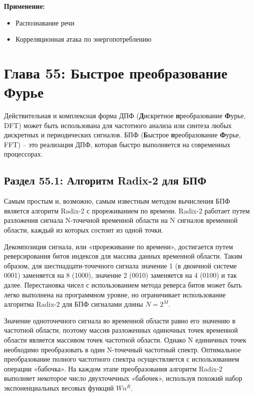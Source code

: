 \vspace{\baselineskip}
\textbf{Применение:}

\begin{itemize}
  \item	Распознавание речи
  \item	Корреляционная атака по энергопотреблению
\end{itemize}

\chapter*{Глава 55: Быстрое преобразование Фурье}

\vspace{-0.3cm}
Действительная и комплексная форма ДПФ (\textbf{Д}искретное \textbf{п}реобразование \textbf{Ф}урье, DFT) может быть использована для частотного анализа или синтеза любых дискретных и периодических сигналов. БПФ (\textbf{Б}ыстрое \textbf{п}реобразование \textbf{Ф}урье, FFT) – это реализация ДПФ, которая быстро выполняется на современных процессорах.

\section*{Раздел 55.1: Алгоритм Radix-2 для БПФ}

Самым простым и, возможно, самым известным методом вычисления БПФ является алгоритм Radix-2 с прореживанием по времени. Radix-2 работает путем разложения сигнала N-точечной временной области на N сигналов временной области, каждый из которых состоит из одной точки.


Декомпозиция сигнала, или «прореживание по времени», достигается путем реверсирования битов индексов для массива данных временной области. Таким образом, для шестнадцати-точечного сигнала значение 1 (в двоичной системе 0001) заменяется на 8 (1000), значение 2 (0010) заменяется на 4 (0100) и так далее. Перестановка чисел с использованием метода реверса битов может быть легко выполнена на программном уровне, но ограничивает использование алгоритма Radix-2 для БПФ сигналами длины $N=2^M$.

\vspace{\baselineskip}
Значение одноточечного сигнала во временной области равно его значению в частотной области, поэтому массив разложенных одиночных точек временной области является массивом точек частотной области. Однако N единичных точек необходимо преобразовать в один N-точечный частотный спектр. Оптимальное преобразование полного частотного спектра осуществляется с использованием операции «бабочка». На каждом этапе преобразования алгоритм Radix-2 выполняет некоторое число двухточечных «бабочек», используя похожий набор экспоненциальных весовых функций $Wn^R$.

